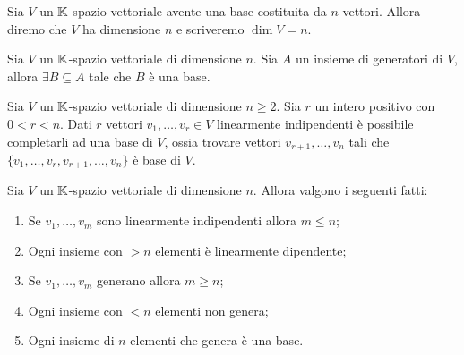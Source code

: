 \begin{definition}[Dimensione]
	Sia $ V $ un $ \mathbb{K} $-spazio vettoriale avente una base costituita da $ n $ vettori. Allora diremo che $ V $ ha dimensione $ n $ e 
	scriveremo $ \dim{V} = n $.
\end{definition}

\begin{thm} 
	Sia $ V $ un $ \mathbb{K} $-spazio vettoriale di dimensione $ n $. Sia $A$ un insieme di generatori di $V$, allora $\exists B \subseteq A$ tale che $B$ è una base.
\end{thm}

\begin{thm}
        Sia $ V $ un $ \mathbb{K} $-spazio vettoriale di dimensione $ n \geq 2 $. Sia $ r $ un intero positivo con $ 0 < r < n $. 
        Dati $ r $ vettori $ v_1, \ldots , v_r \in V $ linearmente indipendenti è possibile completarli ad una base di $ V $, 
        ossia trovare vettori $ v_{r+1}, \ldots, v_n $ tali che $ \{v_1, \ldots , v_r, v_{r+1}, \ldots , v_n\} $ è base di $ V $.
\end{thm}

\begin{prop}
	Sia $ V $ un $ \mathbb{K} $-spazio vettoriale di dimensione $ n $. Allora valgono i seguenti fatti:
	\begin{enumerate}[label=(\roman*)]
                \item Se $ v_1, \ldots, v_m $ sono linearmente indipendenti allora $m \le n$;
                \item Ogni insieme con $>n$ elementi è linearmente dipendente;
                \item Se $ v_1, \ldots, v_m $ generano allora $m \ge n$;
		\item Ogni insieme con $<n$ elementi non genera;
		\item Ogni insieme di $n$ elementi che genera è una base.
        \end{enumerate}
\end{prop}


